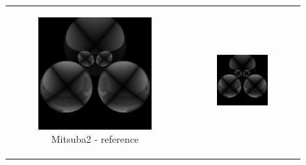 \renewcommand\thesubfigure{\arabic{subfigure}}
\begin{figure}[h]
	\centering
	\begin{tabular}{cc}
		\begin{subfigure}
			{0.4\textwidth}\centering\includegraphics[width=\linewidth]{img/polarizing_spheres.s1.png}
			\caption{Mitsuba2 - reference}
		\end{subfigure}
		&
		\begin{subfigure}
			{0.4\textwidth}\centering\includegraphics[width=\linewidth]{img/polarizing_spheres.s1_ART.png}

\end{subfigure}
\end{tabular}
\end{figure}
